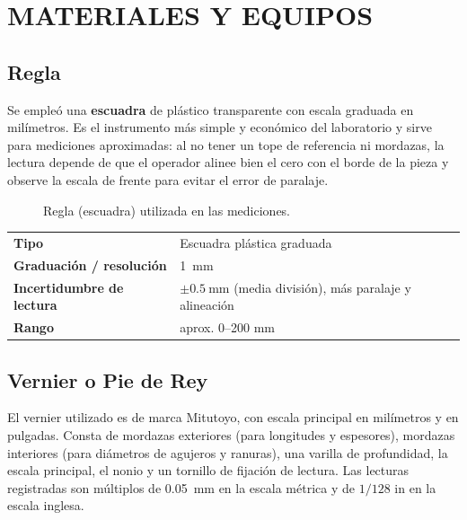 \documentclass[12pt,a4paper]{article}
\begin{document}
\section{MATERIALES Y EQUIPOS}

\subsection{Regla}

Se empleó una \textbf{escuadra} de plástico transparente con escala graduada en
milímetros. Es el instrumento más simple y económico del laboratorio y sirve
para mediciones aproximadas: al no tener un tope de referencia ni mordazas, la
lectura depende de que el operador alinee bien el cero con el borde de la pieza
y observe la escala de frente para evitar el error de paralaje.

\begin{figure}[H]
	\centering
	\caption{Regla (escuadra) utilizada en las mediciones.}
\end{figure}

\begin{table}[!htb]
	\centering
	\small
	\begin{tabularx}{\linewidth}{>{\bfseries}l X}
		Tipo                     & Escuadra plástica graduada
		\\
		Graduación / resolución  & \SI{1}{\milli\metre}
		\\
		Incertidumbre de lectura & $\pm\SI{0.5}{\milli\metre}$ (media división), más
		paralaje y alineación
		\\
		Rango                    & aprox. 0--200 mm
		\\
	\end{tabularx}
\end{table}

\subsection{Vernier o Pie de Rey}

El vernier utilizado es de marca Mitutoyo, con escala principal en milímetros y
en pulgadas. Consta de mordazas exteriores (para longitudes y espesores),
mordazas interiores (para diámetros de agujeros y ranuras), una
varilla de profundidad, la escala principal, el nonio y un tornillo de fijación
de lectura. Las lecturas registradas son múltiplos de \SI{0.05}{\milli\metre} en
la escala métrica y de $1/128$ in en la escala inglesa.
\end{document}
